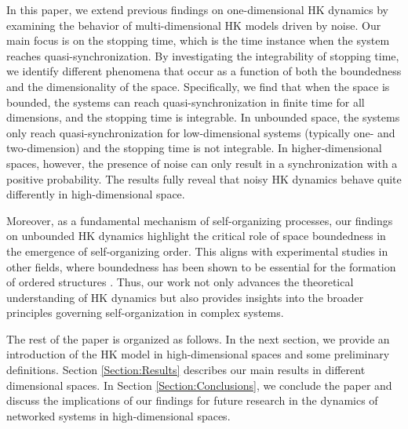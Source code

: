 \documentclass[11pt]{article}
\theoremstyle{definition}
\theoremstyle{remark}
\numberwithin{equation}{section}
\begin{document}
In this paper, we extend previous findings on one-dimensional HK dynamics by examining the behavior of multi-dimensional HK models driven by noise. Our main focus is on the stopping time, which is the time instance when the system reaches quasi-synchronization. By investigating the integrability of stopping time, we identify different phenomena that occur as a function of both the boundedness and the dimensionality of the space. Specifically, we find that when the space is bounded, the systems can reach quasi-synchronization in finite time for all dimensions, and the stopping time is integrable. In unbounded space, the systems only reach quasi-synchronization for low-dimensional systems (typically one- and two-dimension) and the stopping time is not integrable. In higher-dimensional spaces, however, the presence of noise can only result in a synchronization with a positive probability. The results fully reveal that noisy HK dynamics behave quite differently in high-dimensional space.

Moreover, as a fundamental mechanism of self-organizing processes, our findings on unbounded HK dynamics highlight the critical role of space boundedness in the emergence of self-organizing order. This aligns with experimental studies in other fields, where boundedness has been shown to be essential for the formation of ordered structures \cite{Martin2003, Hanczyc2003, Gu2025}. Thus, our work not only advances the theoretical understanding of HK dynamics but also provides insights into the broader principles governing self-organization in complex systems.

The rest of the paper is organized as follows. In the next section, we provide an introduction of the HK model in high-dimensional spaces and some preliminary definitions. Section \ref{Section:Results} describes our main results in different dimensional spaces. In Section \ref{Section:Conclusions}, we conclude the paper and discuss the implications of our findings for future research in the dynamics of networked systems in high-dimensional spaces.
\end{document}

